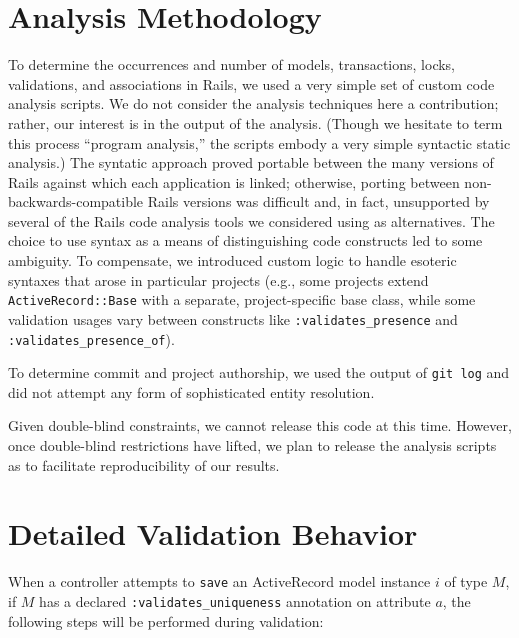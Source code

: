 
\appendix

\section{Analysis Methodology}

To determine the occurrences and number of models, transactions, locks, validations, and associations in Rails, we used a very simple set of custom code analysis scripts. We do not consider the analysis techniques here a contribution; rather, our interest is in the output of the analysis.  (Though we hesitate to term this process ``program analysis,'' the scripts embody a very simple syntactic static analysis.) The syntatic approach proved portable between the many versions of Rails against which each application is linked; otherwise, porting between non-backwards-compatible Rails versions was difficult and, in fact, unsupported by several of the Rails code analysis tools we considered using as alternatives. The choice to use syntax as a means of distinguishing code constructs led to some ambiguity. To compensate, we introduced custom logic to handle esoteric syntaxes that arose in particular projects (e.g., some projects extend \texttt{ActiveRecord::Base} with a separate, project-specific base class, while some validation usages vary between constructs like \texttt{:validates\_presence} and \texttt{:validates\_presence\_of}).

To determine commit and project authorship, we used the output of \texttt{git log} and did not attempt any form of sophisticated entity resolution.

Given double-blind constraints, we cannot release this code at this time. However, once double-blind restrictions have lifted, we plan to release the analysis scripts as to facilitate reproducibility of our results.

\section{Detailed Validation Behavior}

 When a controller attempts to \texttt{save} an ActiveRecord model instance $i$ of type $M$, if $M$ has a declared \texttt{:validates\_uniqueness} annotation on attribute $a$, the following steps will be performed during validation:

